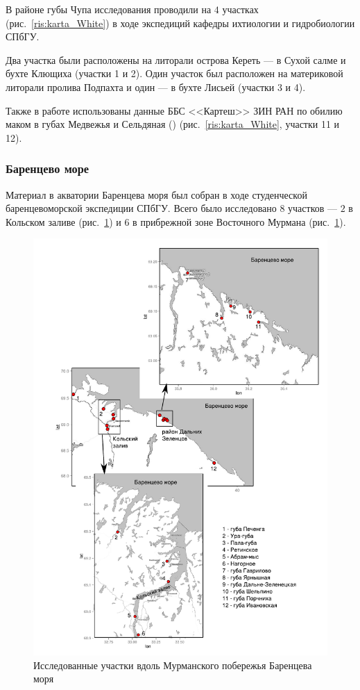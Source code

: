 В районе губы Чупа исследования проводили на $4$ участках (рис.~\ref{ris:karta_White}) в ходе экспедиций кафедры ихтиологии и гидробиологии СПбГУ. 

Два участка были расположены на литорали острова Кереть --- в Сухой салме и бухте Клющиха (участки 1 и 2). 
Один участок был расположен на материковой литорали пролива Подпахта и один --- в бухте Лисьей (участки 3 и 4).

Также в работе использованы данные ББС <<Картеш>> ЗИН РАН по обилию маком в губах Медвежья и Сельдяная (\cite{Varfolomeeva_Naumov_2013}) (рис.~\ref{ris:karta_White}, участки 11 и 12).

		\subsubsection{Баренцево море}
Материал  в акватории Баренцева моря  был  собран    в ходе   студенческой баренцевоморской экспедиции СПбГУ. 
Всего было исследовано $8$ участков --- $2$ в Кольском заливе (рис.~\ref{ris:karta_Barents})   и   $6$  в   прибрежной   зоне  Восточного  Мурмана (рис.~\ref{ris:karta_Barents}).  
	\begin{figure}
    \includegraphics[width=\textwidth]{../maps/Barents_sea1.pdf}
    \caption{Исследованные участки вдоль Мурманского побережья Баренцева моря}
    \label{ris:karta_Barents}
	\end{figure}
